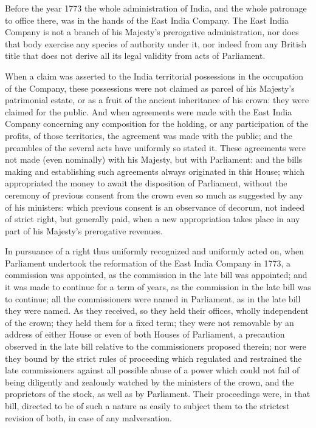 Before the year 1773 the whole administration of India, and the whole patronage to office there, was in the hands of the East India Company. The East India Company is not a branch of his Majesty's prerogative administration, nor does that body exercise any species of authority under it, nor indeed from any British title that does not derive all its legal validity from acts of Parliament.

When a claim was asserted to the India territorial possessions in the occupation of the Company, these possessions were not claimed as parcel of his Majesty's patrimonial estate, or as a fruit of the ancient inheritance of his crown: they were claimed for the public. And when agreements were made with the East India Company concerning any composition for the holding, or any participation of the profits, of those territories, the agreement was made with the public; and the preambles of the several acts have uniformly so stated it. These agreements were not made (even nominally) with his Majesty, but with Parliament: and the bills making and establishing such agreements always originated in this House; which appropriated the money to await the disposition of Parliament, without the ceremony of previous consent from the crown even so much as suggested by any of his ministers: which previous consent is an observance of decorum, not indeed of strict right, but generally paid, when a new appropriation takes place in any part of his Majesty's prerogative revenues.

In pursuance of a right thus uniformly recognized and uniformly acted on, when Parliament undertook the reformation of the East India Company in 1773, a commission was appointed, as the commission in the late bill was appointed; and it was made to continue for a term of years, as the commission in the late bill was to continue; all the commissioners were named in Parliament, as in the late bill they were named. As they received, so they held their offices, wholly independent of the crown; they held them for a fixed term; they were not removable by an address of either House or even of both Houses of Parliament, a precaution observed in the late bill relative to the commissioners proposed therein; nor were they bound by the strict rules of proceeding which regulated and restrained the late commissioners against all possible abuse of a power which could not fail of being diligently and zealously watched by the ministers of the crown, and the proprietors of the stock, as well as by Parliament. Their proceedings were, in that bill, directed to be of such a nature as easily to subject them to the strictest revision of both, in case of any malversation.

